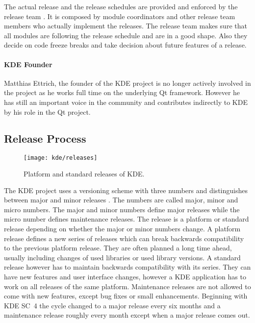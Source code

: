 The actual release and the release schedules are provided and enforced by the
release team \cite{KDEReleaseTeam}. It is composed by module coordinators and
other release team members who actually implement the releases. The release
team makes sure that all modules are following the release schedule and are in
a good shape. Also they decide on code freeze breaks and take decision about
future features of a release.

\paragraph{KDE Founder}

Matthias Ettrich, the founder of the KDE project is no longer actively involved
in the project as he works full time on the underlying Qt framework. However he
has still an important voice in the community and contributes indirectly to KDE
by his role in the Qt project.


\subsection{Release Process} %

\begin{figure}[htbp]
  \centering
  \texttt{[image: kde/releases]}
  \caption[Major Releases of KDE]{Platform and standard releases of KDE.}
\end{figure}

The KDE project uses a versioning scheme with three numbers and distinguishes
between major and minor releases
\cite{KDEReleaseTeam,KDEReleaseSchedule,KDESchedule}. The numbers are called
major, minor and micro numbers. The major and minor numbers define major
releases while the micro number defines maintenance releases. The release is a
platform or standard release depending on whether the major or minor numbers
change. A platform release defines a new series of releases which can break
backwards compatibility to the previous platform release. They are often
planned a long time ahead, usually including changes of used libraries or used
library versions. A standard release however has to maintain backwards
compatibility with its series. They can have new features and user interface
changes, however a KDE application has to work on all releases of the same
platform. Maintenance releases are not allowed to come with new features,
except bug fixes or small enhancements. Beginning with \ac{KDE SC}~4 the cycle
changed to a major release every six months and a maintenance release roughly
every month except when a major release comes out.

